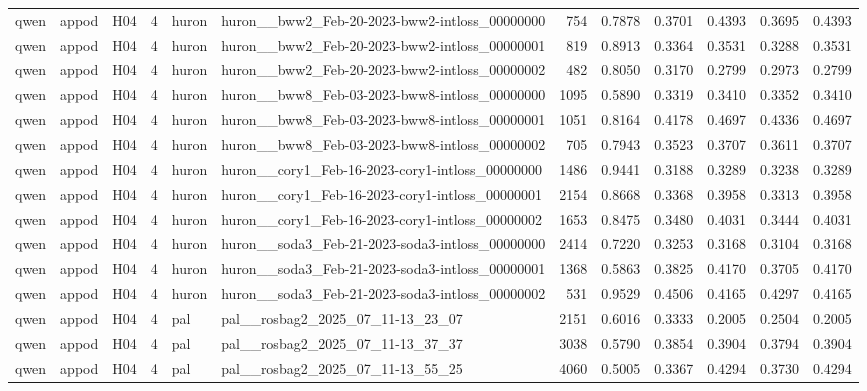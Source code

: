 \begin{table}[tbp]
\begin{tabular}{lllrllrrrrrr}
qwen & appod & H04 & 4 & huron & huron\_\_bww2\_Feb-20-2023-bww2-intloss\_00000000 & 754 & 0.7878 & 0.3701 & 0.4393 & 0.3695 & 0.4393 \\
qwen & appod & H04 & 4 & huron & huron\_\_bww2\_Feb-20-2023-bww2-intloss\_00000001 & 819 & 0.8913 & 0.3364 & 0.3531 & 0.3288 & 0.3531 \\
qwen & appod & H04 & 4 & huron & huron\_\_bww2\_Feb-20-2023-bww2-intloss\_00000002 & 482 & 0.8050 & 0.3170 & 0.2799 & 0.2973 & 0.2799 \\
qwen & appod & H04 & 4 & huron & huron\_\_bww8\_Feb-03-2023-bww8-intloss\_00000000 & 1095 & 0.5890 & 0.3319 & 0.3410 & 0.3352 & 0.3410 \\
qwen & appod & H04 & 4 & huron & huron\_\_bww8\_Feb-03-2023-bww8-intloss\_00000001 & 1051 & 0.8164 & 0.4178 & 0.4697 & 0.4336 & 0.4697 \\
qwen & appod & H04 & 4 & huron & huron\_\_bww8\_Feb-03-2023-bww8-intloss\_00000002 & 705 & 0.7943 & 0.3523 & 0.3707 & 0.3611 & 0.3707 \\
qwen & appod & H04 & 4 & huron & huron\_\_cory1\_Feb-16-2023-cory1-intloss\_00000000 & 1486 & 0.9441 & 0.3188 & 0.3289 & 0.3238 & 0.3289 \\
qwen & appod & H04 & 4 & huron & huron\_\_cory1\_Feb-16-2023-cory1-intloss\_00000001 & 2154 & 0.8668 & 0.3368 & 0.3958 & 0.3313 & 0.3958 \\
qwen & appod & H04 & 4 & huron & huron\_\_cory1\_Feb-16-2023-cory1-intloss\_00000002 & 1653 & 0.8475 & 0.3480 & 0.4031 & 0.3444 & 0.4031 \\
qwen & appod & H04 & 4 & huron & huron\_\_soda3\_Feb-21-2023-soda3-intloss\_00000000 & 2414 & 0.7220 & 0.3253 & 0.3168 & 0.3104 & 0.3168 \\
qwen & appod & H04 & 4 & huron & huron\_\_soda3\_Feb-21-2023-soda3-intloss\_00000001 & 1368 & 0.5863 & 0.3825 & 0.4170 & 0.3705 & 0.4170 \\
qwen & appod & H04 & 4 & huron & huron\_\_soda3\_Feb-21-2023-soda3-intloss\_00000002 & 531 & 0.9529 & 0.4506 & 0.4165 & 0.4297 & 0.4165 \\
qwen & appod & H04 & 4 & pal & pal\_\_rosbag2\_2025\_07\_11-13\_23\_07 & 2151 & 0.6016 & 0.3333 & 0.2005 & 0.2504 & 0.2005 \\
qwen & appod & H04 & 4 & pal & pal\_\_rosbag2\_2025\_07\_11-13\_37\_37 & 3038 & 0.5790 & 0.3854 & 0.3904 & 0.3794 & 0.3904 \\
qwen & appod & H04 & 4 & pal & pal\_\_rosbag2\_2025\_07\_11-13\_55\_25 & 4060 & 0.5005 & 0.3367 & 0.4294 & 0.3730 & 0.4294 \\

\end{tabular}
\end{table}
